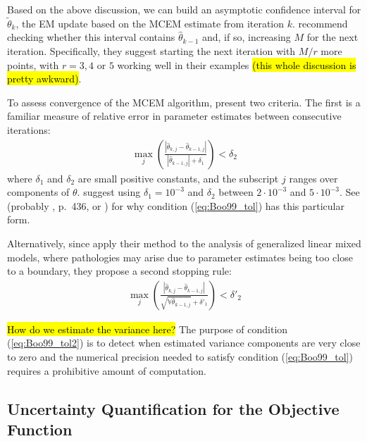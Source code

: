 \documentclass[11pt, oneside]{article}   	%
\newcommand{\bV}{\mathbb{V}}
\begin{document}
Based on the above discussion, we can build an asymptotic confidence interval for $\tilde{\theta}_k$, the EM update based on the MCEM estimate from iteration $k$. \citeauthor{Boo99} recommend checking whether this interval contains $\hat{\theta}_{k-1}$ and, if so, increasing $M$ for the next iteration. Specifically, they suggest starting the next iteration with $M/r$ more points, with $r = 3,4$ or $5$ working well in their examples \hl{(this whole discussion is pretty awkward)}.

To assess convergence of the MCEM algorithm, \citeauthor{Boo99} present two criteria. The first is a familiar measure of relative error in parameter estimates between consecutive iterations:
%
\begin{align}
    \max_j \left( \frac{\left| \hat{\theta}_{k, j} - \hat{\theta}_{k-1,j} \right|}{\left| \hat{\theta}_{k-1,j} \right| + \delta_1} \right) < \delta_2 \label{eq:Boo99_tol}
\end{align}
%
where $\delta_1$ and $\delta_2$ are small positive constants, and the subscript $j$ ranges over components of $\theta$. \citeauthor{Boo99} suggest using $\delta_1 = 10^{-3}$ and $\delta_2$ between $2 \cdot 10^{-3}$ and $5 \cdot 10^{-3}$. See \citep{need} (probably \citealp{Sea06}, p.\ 436, or \citealp{Mar63}) for why condition (\ref{eq:Boo99_tol}) has this particular form.

Alternatively, since \citeauthor{Boo99} apply their method to the analysis of generalized linear mixed models, where pathologies may arise due to parameter estimates being too close to a boundary, they propose a second stopping rule:
%
\begin{align}
    \max_j \left( \frac{\left| \hat{\theta}_{k, j} - \hat{\theta}_{k-1,j} \right|}{\sqrt{\bV \hat{\theta}_{k-1,j}} + \delta'_1} \right) < \delta'_2 \label{eq:Boo99_tol2}
\end{align}

\hl{How do we estimate the variance here?} The purpose of condition (\ref{eq:Boo99_tol2}) is to detect when estimated variance components are very close to zero and the numerical precision needed to satisfy condition (\ref{eq:Boo99_tol}) requires a prohibitive amount of computation.

\subsection{Uncertainty Quantification for the Objective Function \citep{Caf05}}
\end{document}
